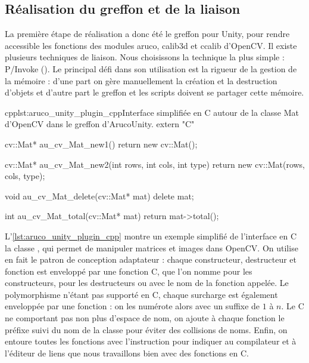 \subsection{Réalisation du greffon et de la liaison}
La première étape de réalisation a donc été le greffon pour Unity, pour rendre accessible les fonctions des modules aruco, calib3d et ccalib d'OpenCV. Il existe plusieurs techniques de liaison. Nous choisissons la technique la plus simple : P/Invoke (). Le principal défi dans son utilisation est la rigueur de la gestion de la mémoire : d'une part on gère manuellement la création et la destruction d'objets et d'autre part le greffon et les scripts doivent se partager cette mémoire.

\begin{listingETS}{cpp}{lst:aruco_unity_plugin_cpp}{Interface simplifiée en C autour de la classe Mat d'OpenCV dans le greffon d'ArucoUnity.}
  extern "C" {
    cv::Mat* au_cv_Mat_new1() {
      return new cv::Mat();
    }

    cv::Mat* au_cv_Mat_new2(int rows, int cols, int type) {
      return new cv::Mat(rows, cols, type);
    }
    
    void au_cv_Mat_delete(cv::Mat* mat) {
      delete mat;
    }

    int au_cv_Mat_total(cv::Mat* mat) {
      return mat->total();
    }
  }
\end{listingETS}

L'\autoref{lst:aruco_unity_plugin_cpp} montre un exemple simplifié de l'interface en C la classe , qui permet de manipuler matrices et images dans OpenCV. On utilise en fait le patron de conception adaptateur : chaque constructeur, destructeur et fonction est enveloppé par une fonction C, que l'on nomme  pour les constructeurs,  pour les destructeurs ou avec le nom de la fonction appelée. Le polymorphisme n'étant pas supporté en C, chaque surcharge est également enveloppée par une fonction : on les numérote alors avec un suffixe de $1$ à $n$. Le C ne comportant pas non plus d'espace de nom, on ajoute à chaque fonction le préfixe  suivi du nom de la classe pour éviter des collisions de noms. Enfin, on entoure toutes les fonctions avec l'instruction  pour indiquer au compilateur et à l'éditeur de liens que nous travaillons bien avec des fonctions en C.

